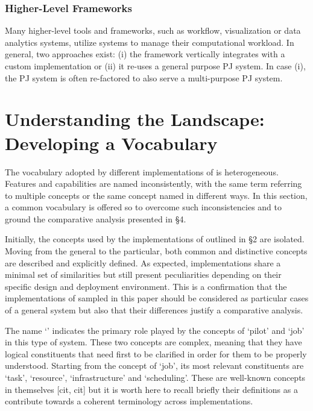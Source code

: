 \documentclass{sig-alternate}
\begin{document}
\subsubsection{Higher-Level Frameworks}

Many higher-level tools and frameworks, such as workflow, visualization or
data analytics systems, utilize \pilotjob systems to manage their
computational workload. In general, two approaches exist: (i) the framework
vertically integrates with a custom \pilotjob implementation or (ii) it
re-uses a general purpose PJ system. In case (i), the PJ system is often
re-factored to also serve a multi-purpose PJ system.


\section{Understanding the Landscape: Developing a Vocabulary}
\label{sec:vocab}


The vocabulary adopted by different implementations of \pilotjob is heterogeneous. Features and capabilities are named inconsistently, with the same term referring to multiple concepts or the same concept named in different ways. In this section, a common vocabulary is offered so to overcome such inconsistencies and to ground the comparative analysis presented in \S 4.


Initially, the concepts used by the implementations of \pilotjob outlined in \S 2 are isolated. Moving from the general to the particular, both common and distinctive concepts are described and explicitly defined. As expected, \pilotjob implementations share a minimal set of similarities but still present peculiarities depending on their specific design and deployment environment. This is a confirmation that the implementations of \pilotjob sampled in this paper should be considered as particular cases of a general \pilotjob system but also that their differences justify a comparative analysis.


The name `\pilotjob' indicates the primary role played by the concepts of `pilot' and `job' in this type of system. These two concepts are complex, meaning that they have logical constituents that need first to be clarified in order for them to be properly understood. Starting from the concept of `job', its most relevant constituents are `task', `resource', `infrastructure' and `scheduling'. These are well-known concepts in themselves [cit, cit] but it is worth here to recall briefly their definitions as a contribute towards a coherent terminology across \pilotjobs implementations. 
\end{document}
